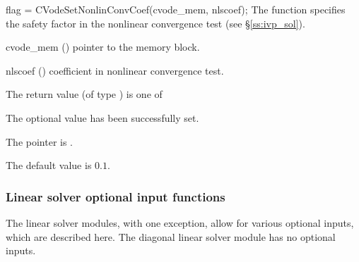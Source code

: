 {
flag = CVodeSetNonlinConvCoef(cvode\_mem, nlscoef);
}
{
  The function  specifies the safety factor
  in the nonlinear convergence test (see \S\ref{ss:ivp_sol}).
}
{
  \begin{args}
  \item[cvode\_mem] ()
    pointer to the {\cvode} memory block.
  \item[nlscoef] ()
    coefficient in nonlinear convergence test.
  \end{args}
}
{
  The return value  (of type ) is one of
  \begin{args}
  \item[\Id{CV\_SUCCESS}] 
    The optional value has been successfully set.
  \item[\Id{CV\_MEM\_NULL}]
    The  pointer is .
  \end{args}
}
{
  The default value is $0.1$.
}

\subsubsection{Linear solver optional input functions}

The linear solver modules, with one exception, allow for various optional 
inputs, which are described here. The diagonal linear solver module has no
optional inputs.
